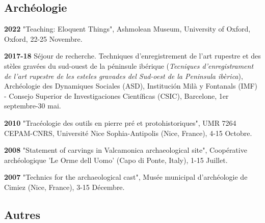 \documentclass{article}
\newcommand{\fr}[1]{#1}       %
\newcommand{\en}[1]{}     %
\begin{document}
\smallbreak

\subsection*{\fr{Archéologie}\en{Archaeology}}

\textbf{2022 }
\fr{"Teaching: Eloquent Things", Ashmolean Museum, University of Oxford, Oxford, 22-25 Novembre.}
\en{"Teaching: Eloquent Things", Ashmolean Museum, University of Oxford, Oxford, November 22-25.}

\smallbreak
\textbf{2017-18}
\fr{Séjour de recherche. Techniques d'enregistrement de l'art rupestre et des stèles gravées du sud-ouest de la péninsule ibérique (\textit{Tecniques d'enregistrament de l'art rupestre de les esteles gravades del Sud-oest de la Peninsula ibèrica}), Archéologie des Dynamiques Sociales (ASD), Institución Milà y Fontanals (IMF) - Consejo Superior de Investigaciones Científicas (CSIC), Barcelone, 1er septembre-30 mai.}
\en{Research Stay. Recording Techniques of Rock Art and Engraved Steles of the Southwestern Iberian Peninsula (\textit{Tecniques d'enregistrament de l'art rupestre de les esteles gravades del Sud-oest de la Peninsula ibèrica}), Archaeology of Social Dynamics (ASD), Institución Milà y Fontanals (IMF) - Spanish National Research Council (CSIC), Barcelona, September 1-May 30.}

\smallbreak
\textbf{2010 }
\fr{"Tracéologie des outils en pierre pré et protohistoriques", UMR 7264 CEPAM-CNRS, Université Nice Sophia-Antipolis (Nice, France), 4-15 Octobre.}
\en{"Traceology of Pre and Protohistoric Stone Tools", UMR 7264 CEPAM-CNRS, University of Nice Sophia-Antipolis (Nice, France), October 4-15.}

\smallbreak
\textbf{2008 }
\fr{"Statement of carvings in Valcamonica archaeological site", Coopérative archéologique 'Le Orme dell Uomo' (Capo di Ponte, Italy), 1-15 Juillet.}
\en{"Statement of Carvings at Valcamonica Archaeological Site", Archaeological Cooperative 'Le Orme dell Uomo' (Capo di Ponte, Italy), July 1-15.}

\smallbreak
\textbf{2007 }
\fr{"Technics for the archaeological cast", Musée municipal d'archéologie de Cimiez (Nice, France), 3-15 Décembre.}
\en{"Techniques for the Archaeological Cast", Municipal Museum of Archaeology of Cimiez (Nice, France), December 3-15.}

\smallbreak

\subsection*{\fr{Autres}\en{Other}}
\end{document}
